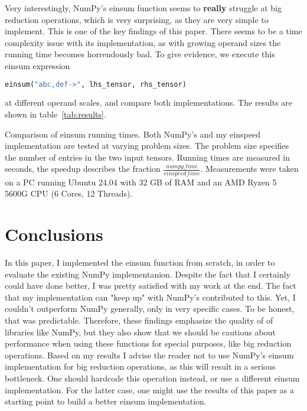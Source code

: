 \documentclass[sigconf]{acmart}
\begin{document}
Very interestingly, NumPy's einsum function seems to \textbf{really} struggle at big reduction operations, which is very surprising, as they are very simple to implement. This is one of the key findings of this paper. There seems to be a time complexity issue with its implementation, as with growing operand sizes the running time becomes horrendously bad. To give evidence, we execute this einsum expression
\begin{lstlisting}[language=Python]
einsum("abc,def->", lhs_tensor, rhs_tensor)
\end{lstlisting}
at different operand scales, and compare both implementations. The results are shown in table~\ref{tab:results}.

\begin{table}[htbp]
  \caption{Comparison of einsum running times. Both NumPy's and my einspeed implementation are tested at varying problem sizes. The problem size specifies the number of entries in the two input tensors. Running times are measured in seconds, the speedup describes the fraction $\frac{numpy\_time}{einspeed\_time}$. 
  Measurements were taken on a PC running Ubuntu 24.04 with 32 GB of RAM and an AMD Ryzen 5 5600G CPU (6 Cores, 12 Threads).}
  \label{tab:results}
\end{table}


\section{Conclusions}
\label{sec:conclusions}
In this paper, I implemented the einsum function from scratch, in order to evaluate the existing NumPy implementanion. Despite the fact that I certainly could have done better, I was pretty satisfied with my work at the end. The fact that my implementation can "keep up" with NumPy's contributed to this. Yet, I couldn't outperform NumPy generally, only in very specific cases. To be honest, that was predictable. Therefore, these findings emphasize the quality of of libraries like NumPy, but they also show that we should be cautious about performance when using these functions for special purposes, like big reduction operations. Based on my results I advise the reader not to use NumPy's einsum implementation for big reduction operations, as this will result in a serious bottleneck. One should hardcode this operation instead, or use a different einsum implementation. For the latter case, one might use the results of this paper as a starting point to build a better einsum implementation.




\end{document}
